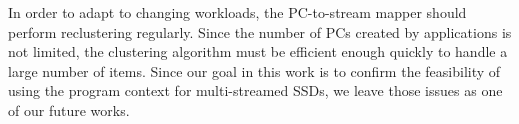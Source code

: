 In order to adapt to changing workloads, the PC-to-stream mapper should perform
reclustering regularly. Since the number of PCs created by applications is not
limited, the clustering algorithm must be efficient enough quickly to handle a
large number of items. Since our goal in this work is to confirm the
feasibility of using the program context for multi-streamed SSDs, we leave
those issues as one of our future works.


%

\vspace{-5pt}
